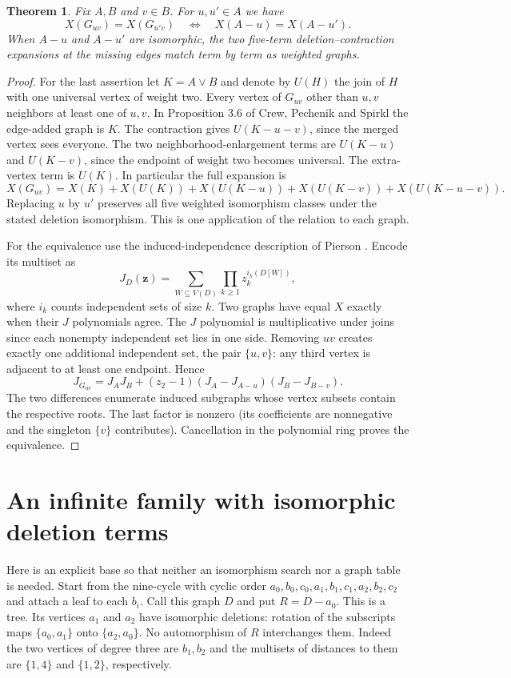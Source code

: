 \documentclass[11pt]{article}
\newtheorem{theorem}{Theorem}
\begin{document}
\begin{theorem}\label{main}
Fix $A,B$ and $v\in B$. For $u,u'\in A$ we have
\[
       X(G_{uv})=X(G_{u'v})\quad\Longleftrightarrow\quad
       X(A-u)=X(A-u').
\]
When $A-u$ and $A-u'$ are isomorphic, the two five-term deletion--contraction
expansions at the missing edges match term by term as weighted graphs.
\end{theorem}
\begin{proof}
For the last assertion let $K=A\vee B$ and denote by $U(H)$ the join
of $H$ with one universal vertex of weight two. Every vertex of $G_{uv}$
other than $u,v$ neighbors at least one of $u,v$. In Proposition 3.6 of
Crew, Pechenik and Spirkl \cite{cps} the edge-added graph is $K$. The
contraction gives $U(K-u-v)$, since the merged vertex sees everyone. The
two neighborhood-enlargement terms are $U(K-u)$ and $U(K-v)$, since the
endpoint of weight two becomes universal. The extra-vertex term is $U(K)$.
In particular the full expansion is
\[
 X(G_{uv})=X(K)+X(U(K))+X(U(K-u))+X(U(K-v))+X(U(K-u-v)).
\]
Replacing $u$ by $u'$ preserves all five weighted isomorphism classes under
the stated deletion isomorphism. This is one application of the relation to
each graph.

For the equivalence use the induced-independence description of Pierson
\cite{pierson,ps}. Encode its multiset as
\[
 J_D(\mathbf z)=\sum_{W\subseteq V(D)}\prod_{k\ge1}z_k^{i_k(D[W])},
\]
where $i_k$ counts independent sets of size $k$. Two graphs have equal $X$
exactly when their $J$ polynomials agree. The $J$ polynomial is multiplicative
under joins since each nonempty independent set lies in one side. Removing
$uv$ creates exactly one additional independent set, the pair $\{u,v\}$:
any third vertex is adjacent to at least one endpoint. Hence
\[
 J_{G_{uv}}=J_AJ_B+(z_2-1)(J_A-J_{A-u})(J_B-J_{B-v}).
\]
The two differences enumerate induced subgraphs whose vertex subsets contain
the respective roots. The last factor is nonzero (its coefficients are
nonnegative and the singleton $\{v\}$ contributes). Cancellation in the
polynomial ring proves the equivalence.
\end{proof}

\section*{An infinite family with isomorphic deletion terms}
Here is an explicit base so that neither an isomorphism search nor a graph
table is needed. Start from the nine-cycle with cyclic order
$a_0,b_0,c_0,a_1,b_1,c_1,a_2,b_2,c_2$ and attach a leaf to each $b_i$.
Call this graph $D$ and put $R=D-a_0$. This is a tree.
Its vertices $a_1$ and $a_2$ have isomorphic deletions:
rotation of the subscripts maps $\{a_0,a_1\}$ onto $\{a_2,a_0\}$.
No automorphism of $R$ interchanges them. Indeed the two vertices of
degree three are $b_1,b_2$ and the multisets of distances to them are
$\{1,4\}$ and $\{1,2\}$, respectively.
\end{document}
